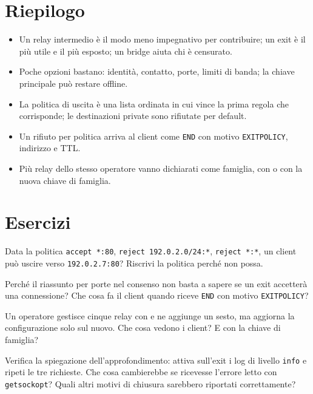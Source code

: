 \section*{Riepilogo}
\begin{itemize}
  \item Un relay intermedio è il modo meno impegnativo per contribuire; un exit è il più utile e il più esposto; un bridge aiuta chi è censurato.
  \item Poche opzioni bastano: identità, contatto, porte, limiti di banda; la chiave principale può restare offline.
  \item La politica di uscita è una lista ordinata in cui vince la prima regola che corrisponde; le destinazioni private sono rifiutate per default.
  \item Un rifiuto per politica arriva al client come \texttt{END} con motivo \texttt{EXITPOLICY}, indirizzo e TTL.
  \item Più relay dello stesso operatore vanno dichiarati come famiglia, con  o con la nuova chiave di famiglia.
\end{itemize}

\section*{Esercizi}

\begin{esercizio}[1]\label{es:22-ordine}
Data la politica \texttt{accept *:80}, \texttt{reject 192.0.2.0/24:*}, \texttt{reject *:*}, un client può uscire verso \texttt{192.0.2.7:80}? Riscrivi la politica perché non possa.
\end{esercizio}

\begin{esercizio}[1]\label{es:22-riassunto}
Perché il riassunto per porte nel consenso non basta a sapere se un exit accetterà una connessione? Che cosa fa il client quando riceve \texttt{END} con motivo \texttt{EXITPOLICY}?
\end{esercizio}

\begin{esercizio}[2]\label{es:22-famiglia}
Un operatore gestisce cinque relay con  e ne aggiunge un sesto, ma aggiorna la configurazione solo sul nuovo. Che cosa vedono i client? E con la chiave di famiglia?
\end{esercizio}

\begin{esercizio}[2]\label{es:22-refused}
Verifica la spiegazione dell'approfondimento: attiva sull'exit i log di livello \texttt{info} e ripeti le tre richieste. Che cosa cambierebbe se  ricevesse l'errore letto con \texttt{getsockopt}? Quali altri motivi di chiusura sarebbero riportati correttamente?
\end{esercizio}

